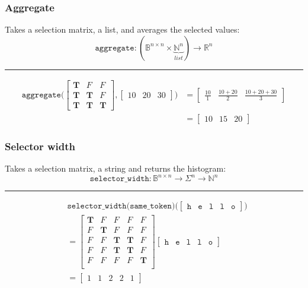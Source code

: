 \documentclass[mathserif,notheorems]{beamer}
\theoremstyle{plain} %
\theoremstyle{definition} %
\begin{document}
    \begin{frame}
      \frametitle{Aggregate}
      Takes a selection matrix, a list, and averages the selected values:\\
      $$
      \texttt{aggregate}: (\mathbb{B}^{n\times n} \times \underbrace{\mathbb{N}^n}_{list}) → \mathbb{R}^n
      $$
        \noindent\rule{\textwidth}{1pt}
    \begin{align*}
        \texttt{aggregate(}\begin{bmatrix}
        \textbf{T} & F & F \\
        \textbf{T} & \textbf{T} & F \\
        \textbf{T} & \textbf{T} & \textbf{T}
      \end{bmatrix},
      \begin{bmatrix}
        10 & 20 & 30
      \end{bmatrix}\texttt{)}
      &=
      \begin{bmatrix}
        \frac{10}{1} & \frac{10 + 20}{2} & \frac{10 + 20 + 30}{3}
      \end{bmatrix}\\
      &=
      \begin{bmatrix}
        10 & 15 & 20
      \end{bmatrix}
      \end{align*}
  \end{frame}

  \begin{frame}
    \frametitle{Selector width}
    Takes a selection matrix, a string and returns the histogram:
    $$
    \texttt{selector\_width}: \mathbb{B}^{n\times n} → \Sigma^n → \mathbb{N}^n
    $$
    \noindent\rule{\textwidth}{1pt}
    \begin{align*}
      &\texttt{selector\_width(same\_token)(}
      \begin{bmatrix}
        \texttt{h} & \texttt{e} & \texttt{l} & \texttt{l} & \texttt{o}
      \end{bmatrix}\texttt{)}\\
      &=
      \begin{bmatrix}
        \textbf{T} & F & F & F & F \\
        F & \textbf{T} & F & F & F \\
        F & F & \textbf{T} & \textbf{T} & F \\
        F & F & \textbf{T} & \textbf{T} & F \\
        F & F & F & F & \textbf{T} \\
      \end{bmatrix}
      \begin{bmatrix}
        \texttt{h} & \texttt{e} & \texttt{l} & \texttt{l} & \texttt{o}
      \end{bmatrix}\\
      &=
      \begin{bmatrix}
        1 & 1 & 2 & 2 & 1
      \end{bmatrix}
    \end{align*}
  \end{frame}
\end{document}
